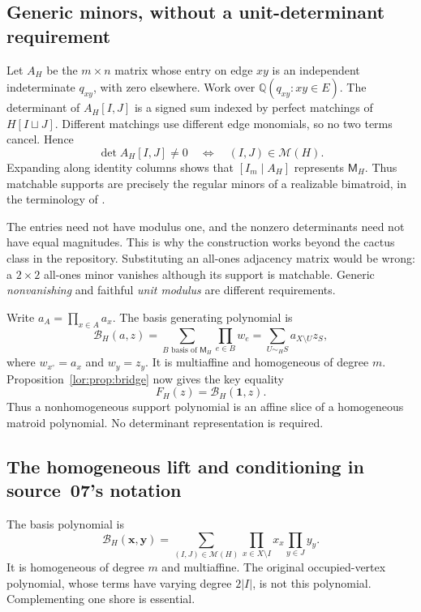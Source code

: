 \documentclass[11pt]{article}
\numberwithin{equation}{section}
\theoremstyle{definition}
\newcommand{\PM}{\mathcal M}
\newcommand{\cB}{\mathcal B}
\begin{document}
\subsection{Generic minors, without a unit-determinant requirement}
Let $A_H$ be the $m\times n$ matrix whose entry on edge $xy$ is an independent
indeterminate $q_{xy}$, with zero elsewhere. Work over
$\mathbb Q(q_{xy}:xy\in E)$. The determinant of $A_H[I,J]$ is a signed sum indexed
by perfect matchings of $H[I\sqcup J]$. Different matchings use different
edge monomials, so no two terms cancel. Hence
\begin{equation}
 \det A_H[I,J]\ne0\quad\Longleftrightarrow\quad(I,J)\in\PM(H).
 \label{lor:sp:eq:generic}
\end{equation}
Expanding along identity columns shows that $[I_m\mid A_H]$ represents
$\mathsf M_H$. Thus matchable supports are precisely the regular minors of a realizable
bimatroid, in the terminology of \cite{RU}.

The entries need not have modulus one, and the nonzero determinants need not
have equal magnitudes. This is why the construction works beyond the cactus
class in the repository. Substituting an all-ones adjacency matrix would be
wrong: a $2\times2$ all-ones minor vanishes although its support is matchable.
Generic \emph{nonvanishing} and faithful \emph{unit modulus} are different
requirements.

Write $a_A=\prod_{x\in A}a_x$. The basis generating polynomial is
\begin{equation}
 \mathcal B_H(a,z)=\sum_{B\text{ basis of }\mathsf M_H}\prod_{e\in B}w_e
   =\sum_{U\sim_H S}a_{X\setminus U}z_S,
 \label{lor:eq:basispoly}
\end{equation}
where $w_{x^\circ}=a_x$ and $w_y=z_y$. It is multiaffine and homogeneous of
degree $m$. Proposition~\ref{lor:prop:bridge} now gives the key equality
\begin{equation}
 \boxed{F_H(z)=\mathcal B_H(\mathbf1,z).}
 \label{lor:eq:dehom}
\end{equation}
Thus a nonhomogeneous support polynomial is an affine slice of a
homogeneous matroid polynomial. No determinant representation is required.


\subsection{The homogeneous lift and conditioning in source~07's notation}
\label{lor:sec:sp:lift}
The basis polynomial is
\begin{equation}
 \cB_H(\mathbf x,\mathbf y)
 =\sum_{(I,J)\in\PM(H)}\prod_{x\in X\setminus I}x_x
                              \prod_{y\in J}y_y.
 \label{lor:sp:eq:basis}
\end{equation}
It is homogeneous of degree $m$ and multiaffine. The original occupied-vertex
polynomial, whose terms have varying degree $2|I|$, is not this polynomial.
Complementing one shore is essential.
\end{document}
